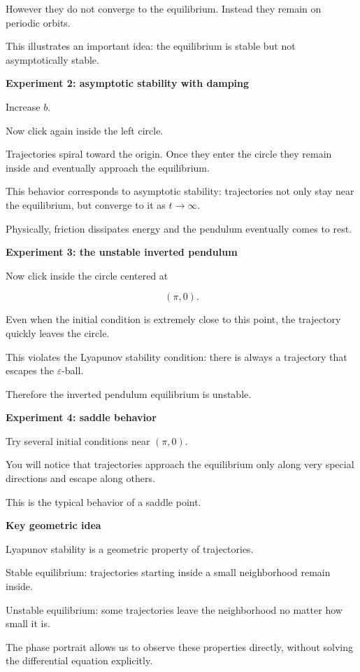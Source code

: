 However they do not converge to the equilibrium. Instead they remain on
periodic orbits.

This illustrates an important idea: the equilibrium is stable but not
asymptotically stable.

\textbf{Experiment 2: asymptotic stability with damping}

Increase \(b\).

Now click again inside the left circle.

Trajectories spiral toward the origin. Once they enter the circle they
remain inside and eventually approach the equilibrium.

This behavior corresponds to asymptotic stability: trajectories not
only stay near the equilibrium, but converge to it as \(t\to\infty\).

Physically, friction dissipates energy and the pendulum eventually
comes to rest.

\textbf{Experiment 3: the unstable inverted pendulum}

Now click inside the circle centered at

\[
(\pi,0).
\]

Even when the initial condition is extremely close to this point, the
trajectory quickly leaves the circle.

This violates the Lyapunov stability condition: there is always a
trajectory that escapes the \(\varepsilon\)-ball.

Therefore the inverted pendulum equilibrium is unstable.

\textbf{Experiment 4: saddle behavior}

Try several initial conditions near \((\pi,0)\).

You will notice that trajectories approach the equilibrium only along
very special directions and escape along others.

This is the typical behavior of a saddle point.

\textbf{Key geometric idea}

Lyapunov stability is a geometric property of trajectories.

Stable equilibrium:
trajectories starting inside a small neighborhood remain inside.

Unstable equilibrium:
some trajectories leave the neighborhood no matter how small it is.

The phase portrait allows us to observe these properties directly,
without solving the differential equation explicitly.
